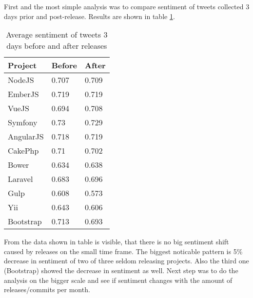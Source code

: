 First and the most simple analysis was to compare sentiment of tweets collected 3 days prior and post-release. Results are shown in table \ref{table:BeforeAfterReleaseSentiment}.

\begin{table}[H]
\centering
\begin{tabular}{ |p{3cm}|p{3cm}|p{3cm}|}
 \hline
\textbf{Project }& \textbf{Before}& \textbf{After}\\
 \hline
 NodeJS   & 0.707 & 0.709\\ \hline
 EmberJS   & 0.719 & 0.719\\ \hline
 VueJS   & 0.694 & 0.708\\ \hline 
 Symfony & 0.73 & 0.729\\ \hline   
 AngularJS   & 0.718 & 0.719\\ \hline
 CakePhp & 0.71 & 0.702\\ \hline 
 Bower   & 0.634 & 0.638\\ \hline 
 Laravel & 0.683 & 0.696\\ \hline
 Gulp & 0.608 & 0.573\\ \hline
 Yii & 0.643 & 0.606\\ \hline
 Bootstrap & 0.713 & 0.693\\ \hline
\end{tabular}
\caption{Average sentiment of tweets 3 days before and after releases}
\label{table:BeforeAfterReleaseSentiment}
\end{table}

From the data shown in table is visible, that there is no big sentiment shift caused by releases on the small time frame. The biggest noticable pattern is 5\% decrease in sentiment of two of three seldom releasing projects. Also the third one (Bootstrap) showed the decrease in sentiment as well. Next step was to do the analysis on the bigger scale and see if sentiment changes with the amount of releases/commits per month.